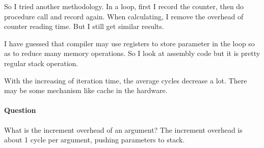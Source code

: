 So I tried another methodology. In a loop, first I record the counter, then do procedure call and record again. When calculating, I remove the overhead of counter reading time. But I still get similar results.

I have guessed that compiler may use registers to store parameter in the loop so as to reduce many memory operations. So I look at assembly code but it is pretty regular stack operation.

With the increasing of iteration time, the average cycles decrease a lot. There may be some mechanism like cache in the hardware.

\paragraph{Question} What is the increment overhead of an argument? The increment overhead is about 1 cycle per  argument, pushing parameters to stack.
